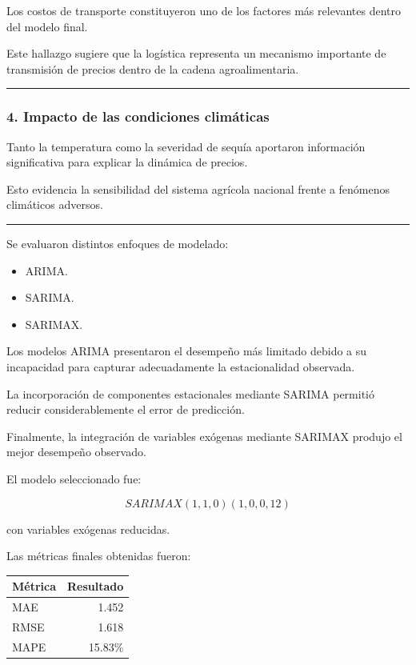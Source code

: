\documentclass[11pt]{article}
\providecommand{\tightlist}{%
      \setlength{\itemsep}{0pt}\setlength{\parskip}{0pt}}
\begin{document}
Los costos de transporte constituyeron uno de los factores más
relevantes dentro del modelo final.

Este hallazgo sugiere que la logística representa un mecanismo
importante de transmisión de precios dentro de la cadena
agroalimentaria.

\begin{center}\rule{0.5\linewidth}{0.5pt}\end{center}

\hypertarget{impacto-de-las-condiciones-climuxe1ticas}{%
\subsubsection{4. Impacto de las condiciones
climáticas}\label{impacto-de-las-condiciones-climuxe1ticas}}

Tanto la temperatura como la severidad de sequía aportaron información
significativa para explicar la dinámica de precios.

Esto evidencia la sensibilidad del sistema agrícola nacional frente a
fenómenos climáticos adversos.

\begin{center}\rule{0.5\linewidth}{0.5pt}\end{center}

Se evaluaron distintos enfoques de modelado:

\begin{itemize}
\tightlist
\item
  ARIMA.
\item
  SARIMA.
\item
  SARIMAX.
\end{itemize}

Los modelos ARIMA presentaron el desempeño más limitado debido a su
incapacidad para capturar adecuadamente la estacionalidad observada.

La incorporación de componentes estacionales mediante SARIMA permitió
reducir considerablemente el error de predicción.

Finalmente, la integración de variables exógenas mediante SARIMAX
produjo el mejor desempeño observado.

El modelo seleccionado fue:

\[
SARIMAX(1,1,0)(1,0,0,12)
\]

con variables exógenas reducidas.

Las métricas finales obtenidas fueron:

\begin{longtable}[]{@{}lr@{}}
\toprule\noalign{}
Métrica & Resultado \\
\midrule\noalign{}
\endhead
\bottomrule\noalign{}
\endlastfoot
MAE & 1.452 \\
RMSE & 1.618 \\
MAPE & 15.83\% \\
\end{longtable}
\end{document}
